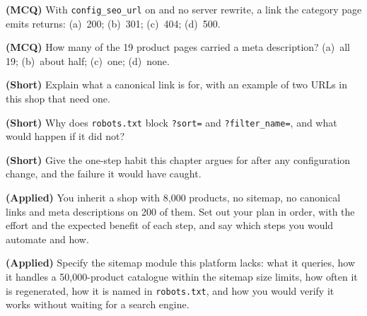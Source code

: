 \begin{reviewq}
  \item \textbf{(MCQ)} With \texttt{config\_seo\_url} on and no server rewrite,
        a link the category page emits returns: (a)~200; (b)~301; (c)~404;
        (d)~500.
  \item \textbf{(MCQ)} How many of the 19 product pages carried a meta
        description? (a)~all 19; (b)~about half; (c)~one; (d)~none.
  \item \textbf{(Short)} Explain what a canonical link is for, with an example
        of two URLs in this shop that need one.
  \item \textbf{(Short)} Why does \texttt{robots.txt} block \texttt{?sort=} and
        \texttt{?filter\_name=}, and what would happen if it did not?
  \item \textbf{(Short)} Give the one-step habit this chapter argues for after
        any configuration change, and the failure it would have caught.
  \item \textbf{(Applied)} You inherit a shop with 8{,}000 products, no
        sitemap, no canonical links and meta descriptions on 200 of them. Set
        out your plan in order, with the effort and the expected benefit of
        each step, and say which steps you would automate and how.
  \item \textbf{(Applied)} Specify the sitemap module this platform lacks: what
        it queries, how it handles a 50{,}000-product catalogue within the
        sitemap size limits, how often it is regenerated, how it is named in
        \texttt{robots.txt}, and how you would verify it works without waiting
        for a search engine.
\end{reviewq}
